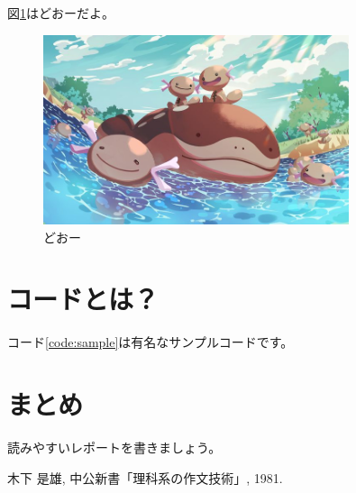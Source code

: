 \documentclass[uplatex,a4j]{jsarticle}
\begin{document}
図\ref{fig:tn}はどおーだよ。

\begin{figure}[ht]
  \centering
  \includegraphics[width=0.8\textwidth]{clodsire.jpg}
  \caption{どおー}
  \label{fig:tn}
\end{figure}

\section{コードとは？}
\label{sec:code}

コード\ref{code:sample}は有名なサンプルコードです。



\section{まとめ}
読みやすいレポートを書きましょう。

\begin{thebibliography}{99}
  木下 是雄, 中公新書「理科系の作文技術」, 1981.
\end{thebibliography}
\end{document}
